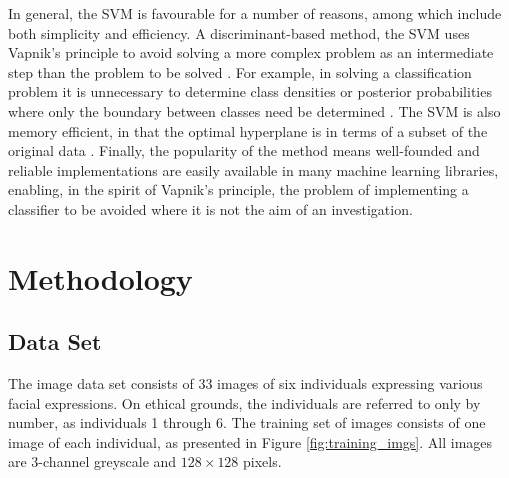 In general, the SVM is favourable for a number of reasons, among which include both simplicity and efficiency. A discriminant-based method, the SVM uses Vapnik's principle to avoid solving a more complex problem as an intermediate step than the problem to be solved \cite{alpaydin_2020}. For example, in solving a classification problem it is unnecessary to determine class densities or posterior probabilities where only the boundary between classes need be determined \cite{alpaydin_2020}. The SVM is also memory efficient, in that the optimal hyperplane is in terms of a subset of the original data \cite{alpaydin_2020}. Finally, the popularity of the method means well-founded and reliable implementations are easily available in many machine learning libraries, enabling, in the spirit of Vapnik's principle, the problem of implementing a classifier to be avoided where it is not the aim of an investigation.

\newpage
\section{Methodology}
\subsection{Data Set}

The image data set consists of 33 images of six individuals expressing various facial expressions. On ethical grounds, the individuals are referred to only by number, as individuals 1 through 6. The training set of images consists of one image of each individual, as presented in Figure \ref{fig:training_imgs}. All images are 3-channel greyscale and $128\times128$ pixels.

